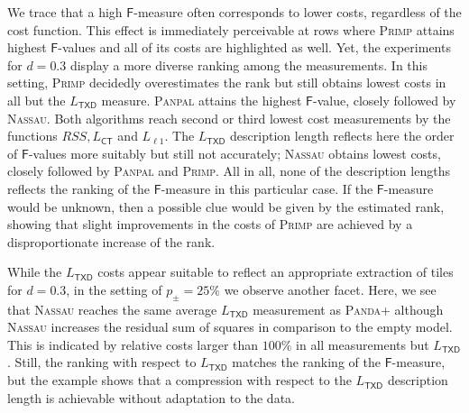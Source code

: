 We trace that a high $\mathsf{F}$-measure often corresponds to lower costs, regardless of the cost function. This effect is immediately perceivable at rows where \textsc{Primp} attains highest $\mathsf{F}$-values and all of its costs are highlighted as well. Yet, the experiments for $d=0.3$ display a  more diverse ranking among the measurements. In this setting, \textsc{Primp} decidedly overestimates the rank but still obtains lowest costs in all but the $L_\mathsf{TXD}$ measure. \textsc{Panpal} attains the highest $\mathsf{F}$-value, closely followed by \textsc{Nassau}. Both algorithms reach second or third lowest cost measurements by the functions $RSS,L_{\mathsf{CT}}$ and $L_{\ell 1}$. The $L_\mathsf{TXD}$ description length reflects here the order of $\mathsf{F}$-values more suitably but still not accurately; \textsc{Nassau} obtains lowest costs, closely followed by \textsc{Panpal} and \textsc{Primp}. All in all, none of the description lengths reflects the ranking of the $\mathsf{F}$-measure in this particular case. If the $\mathsf{F}$-measure would be unknown, then a possible clue would be given by the estimated rank, showing that slight improvements in the costs of \textsc{Primp} are achieved by a disproportionate increase of the rank. 

While the $L_\mathsf{TXD}$ costs appear suitable to reflect an appropriate extraction of tiles for $d=0.3$, in the setting of $p_\pm=25\%$ we observe another facet. Here, we see that  \textsc{Nassau} reaches the same average $L_\mathsf{TXD}$ measurement as \textsc{Panda+} although \textsc{Nassau} increases the residual sum of squares in comparison to the empty model. This is indicated by relative costs larger than $100\%$ in all measurements but $L_\mathsf{TXD}$. Still, the ranking with respect to $L_\mathsf{TXD}$ matches the ranking of the $\mathsf{F}$-measure, but the example shows that a compression with respect to the $L_\mathsf{TXD}$ description length is achievable without adaptation to the data.

